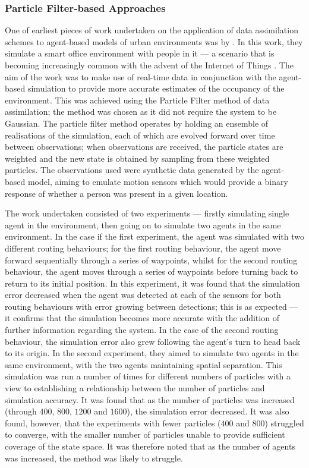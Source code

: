 \subsubsection{Particle Filter-based Approaches}\label{subs:lit_rev:da_abm:pf}

One of earliest pieces of work undertaken on the application of data
assimilation schemes to agent-based models of urban environments was by
\citet{wang2013data}.
In this work, they simulate a smart office environment with people in it --- a
scenario that is becoming increasingly common with the advent of the Internet of
Things \citep{zanella2014internet}.
The aim of the work was to make use of real-time data in conjunction with the
agent-based simulation to provide more accurate estimates of the occupancy of
the environment.
This was achieved using the Particle Filter method of data assimilation; the
method was chosen as it did not require the system to be Gaussian.
The particle filter method operates by holding an ensemble of realisations of
the simulation, each of which are evolved forward over time between
observations; when observations are received, the particle states are weighted
and the new state is obtained by sampling from these weighted particles.
The observations used were synthetic data generated by the agent-based model,
aiming to emulate motion sensors which would provide a binary response of
whether a person was present in a given location.

The work undertaken consisted of two experiments --- firstly simulating single
agent in the environment, then going on to simulate two agents in the same
environment.
In the case if the first experiment, the agent was simulated with two different
routing behaviours; for the first routing behaviour, the agent move forward
sequentially through a series of waypoints, whilst for the second routing
behaviour, the agent moves through a series of waypoints before turning back to
return to its initial position.
In this experiment, it was found that the simulation error decreased when the
agent was detected at each of the sensors for both routing behaviours with error
growing between detections; this is as expected --- it confirms that the
simulation becomes more accurate with the addition of further information
regarding the system.
In the case of the second routing behaviour, the simulation error also grew
following the agent's turn to head back to its origin.
In the second experiment, they aimed to simulate two agents in the same
environment, with the two agents maintaining spatial separation.
This simulation was run a number of times for different numbers of particles
with a view to establishing a relationship between the number of particles and
simulation accuracy.
It was found that as the number of particles was increased (through $400$,
$800$, $1200$ and $1600$), the simulation error decreased.
It was also found, however, that the experiments with fewer particles ($400$ and
$800$) struggled to converge, with the smaller number of particles unable to
provide sufficient coverage of the state space.
It was therefore noted that as the number of agents was increased, the method
was likely to struggle.


